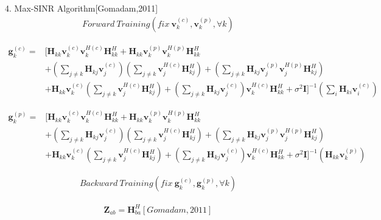 \documentclass[11pt, oneside]{article}   	%
\begin{document}
4. Max-SINR Algorithm[Gomadam,2011]
\begin{align*}
Forward\ Training (fix\  \textbf{v}^{(c)}_{k}, \textbf{v}^{(p)}_{k}, \forall k)
\end{align*}

\begin{align*}
\textbf{g}^{(c)}_{k} = 
&\bigg[
\textbf{H}_{kk}	\textbf{v}^{(c)}_{k}	\textbf{v}^{H(c)}_{k}	\textbf{H}^{H}_{kk}
+\textbf{H}_{kk}	\textbf{v}^{(p)}_{k}	\textbf{v}^{H(p)}_{k}	\textbf{H}^{H}_{kk}	\\
&+(\displaystyle\sum_{j \neq k}\textbf{H}_{kj}\textbf{v}^{(c)}_{j})
(\displaystyle\sum_{j \neq k}\textbf{v}^{H(c)}_{j}\textbf{H}^{H}_{kj})
+(\displaystyle\sum_{j \neq k}\textbf{H}_{kj}\textbf{v}^{(p)}_{j} \textbf{v}^{H(p)}_{j}\textbf{H}^{H}_{kj})	\\
&+\textbf{H}_{kk}	\textbf{v}^{(c)}_{k}
(\displaystyle\sum_{j \neq k}\textbf{v}^{H(c)}_{j}\textbf{H}^{H}_{kj})
+(\displaystyle\sum_{j \neq k}\textbf{H}_{kj}\textbf{v}^{(c)}_{j})
\textbf{v}^{H(c)}_{k}	\textbf{H}^{H}_{kk}
+\sigma^2	\textbf{I}
\bigg]^{-1}	 	(\displaystyle\sum_{i}	\textbf{H}_{ki} 	\textbf{v}^{(c)}_{i})	
\end{align*}

\begin{align*}
\textbf{g}^{(p)}_{k} = 	
&\bigg[
\textbf{H}_{kk}	\textbf{v}^{(c)}_{k}	\textbf{v}^{H(c)}_{k}	\textbf{H}^{H}_{kk}
+\textbf{H}_{kk}	\textbf{v}^{(p)}_{k}	\textbf{v}^{H(p)}_{k}	\textbf{H}^{H}_{kk}	\\
&+(\displaystyle\sum_{j \neq k}\textbf{H}_{kj}\textbf{v}^{(c)}_{j})
(\displaystyle\sum_{j \neq k}\textbf{v}^{H(c)}_{j}\textbf{H}^{H}_{kj})
+(\displaystyle\sum_{j \neq k}\textbf{H}_{kj}\textbf{v}^{(p)}_{j} \textbf{v}^{H(p)}_{j}\textbf{H}^{H}_{kj})	\\
&+\textbf{H}_{kk}	\textbf{v}^{(c)}_{k}
(\displaystyle\sum_{j \neq k}\textbf{v}^{H(c)}_{j}\textbf{H}^{H}_{kj})
+(\displaystyle\sum_{j \neq k}\textbf{H}_{kj}\textbf{v}^{(c)}_{j})
\textbf{v}^{H(c)}_{k}	\textbf{H}^{H}_{kk}
+\sigma^2	\textbf{I}
\bigg]^{-1}	 (\textbf{H}_{kk} 	\textbf{v}^{(p)}_{k})
\end{align*}

\begin{align*}
Backward\ Training (fix\  \textbf{g}^{(c)}_{k}, \textbf{g}^{(p)}_{k}, \forall k)
\end{align*}

\begin{align*}
\textbf{Z}_{ab}=\textbf{H}^{H}_{ba} [Gomadam, 2011]
\end{align*}
\end{document}
